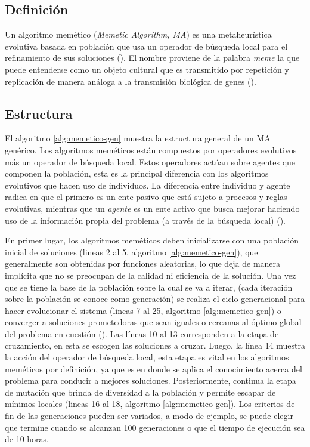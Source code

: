 \label{fundamentos:memeticos}

\subsection{Definición}
Un algoritmo memético (\textit{Memetic Algorithm, MA}) es una metaheurística evolutiva basada en población que usa un operador de búsqueda local para el refinamiento de sus soluciones (\citealp{moscato:2011}). El nombre proviene de la palabra \textit{meme} la que puede entenderse como un objeto cultural que es transmitido por repetición y replicación de manera análoga a la transmisión biológica de genes (\citealp{meme:2015}).

\subsection{Estructura}

El algoritmo \ref{alg:memetico-gen} muestra la estructura general de un MA genérico. Los algoritmos meméticos están compuestos por operadores evolutivos más un operador de búsqueda local. Estos operadores actúan sobre agentes que componen la población, esta es la principal diferencia con los algoritmos evolutivos que hacen uso de individuos. La diferencia entre individuo y agente radica en que el primero es un ente pasivo que está sujeto a procesos y reglas evolutivas, mientras que un \textit{agente} es un ente activo que busca mejorar haciendo uso de la información propia del problema (a través de la búsqueda local) (\citealp{moscato:2011}).

En primer lugar, los algoritmos meméticos deben inicializarse con una población inicial de soluciones (lineas 2 al 5, algoritmo \ref{alg:memetico-gen}), que generalmente son obtenidas por funciones aleatorias, lo que deja de manera implícita que no se preocupan de la calidad ni eficiencia de la solución. Una vez que se tiene la base de la población sobre la cual se va a iterar, (cada iteración sobre la población se conoce como generación) se realiza el ciclo generacional para hacer evolucionar el sistema (lineas 7 al 25, algoritmo \ref{alg:memetico-gen}) o converger a soluciones prometedoras que sean iguales o cercanas al óptimo global del problema en cuestión (\citealp{hugo}). Las líneas 10 al 13 corresponden a la etapa de cruzamiento, en esta se escogen las soluciones a cruzar. Luego, la línea 14 muestra la acción del operador de búsqueda local, esta etapa es vital en los algoritmos meméticos por definición, ya que es en donde se aplica el conocimiento acerca del problema para conducir a mejores soluciones. Posteriormente, continua la etapa de mutación que brinda de diversidad a la población y permite escapar de mínimos locales (lineas 16 al 18, algoritmo \ref{alg:memetico-gen}). Los criterios de fin de las generaciones pueden ser variados, a modo de ejemplo, se puede elegir que termine cuando se alcanzan 100 generaciones o que el tiempo de ejecución sea de 10 horas.


